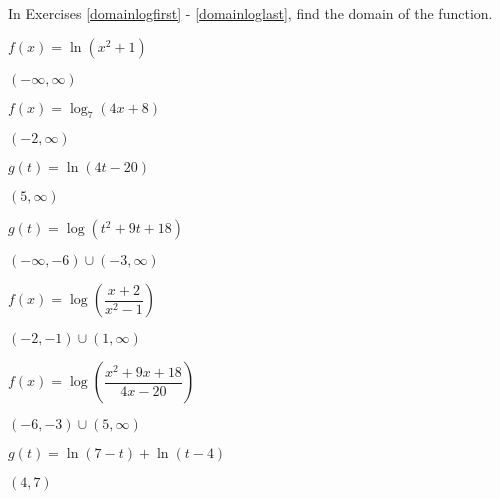 \documentclass{ximera}
\begin{document}
\begin{question}
In Exercises \ref{domainlogfirst} - \ref{domainloglast}, find the domain of the function.

\begin{problem}\label{domainlogfirst}
$f(x) = \ln(x^{2} + 1)$

\begin{solution}
    $(-\infty, \infty)$
\end{solution}

\end{problem}

\begin{problem}
$f(x) = \log_{7}(4x + 8)$

\begin{solution}
    $(-2, \infty)$
\end{solution}
\end{problem}

\begin{problem}
$g(t) = \ln(4t-20)$

\begin{solution}
$(5, \infty)$
\end{solution}
\end{problem}

\begin{problem}
$g(t) = \log \left(t^2+9t+18\right)$

\begin{solution}
    $(-\infty, -6) \cup (-3, \infty)$
\end{solution}
\end{problem}

\begin{problem}
$f(x) = \log \left(\dfrac{x + 2}{x^{2} - 1}\right)$

\begin{solution}
    $(-2, -1) \cup (1, \infty)$
\end{solution}
\end{problem}

\begin{problem}
$f(x) = \log\left(\dfrac{x^2+9x+18}{4x-20}\right)$

\begin{solution}
$(-6,-3) \cup (5, \infty)$
\end{solution}
\end{problem}

\begin{problem}
$g(t) = \ln(7 - t) + \ln(t - 4)$

\begin{solution}
    $(4, 7)$
\end{solution}
\end{problem}


\end{question}
\end{document}
